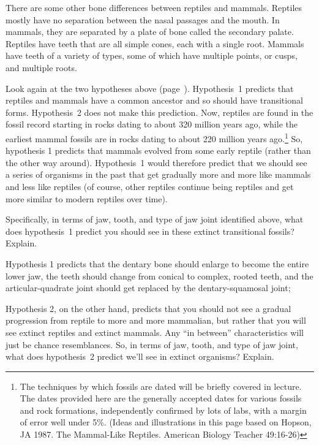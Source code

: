 \documentclass[12pt, hidelinks]{exam}
\newcommand*\AnswerBox[2]{%
    \parbox[t][#1]{0.92\textwidth}{%
    \begin{solution}#2\end{solution}}
    \vspace{\stretch{1}}
}
\begin{document}
\begin{questions}
There are some other bone differences between reptiles and mammals.  Reptiles mostly have no separation between the nasal passages and the mouth.  In mammals, they are separated by a plate of bone called the secondary palate.  Reptiles have teeth that are all simple cones, each with a single root.  Mammals have teeth of a variety of types, some of which have multiple points, or cusps, and multiple roots.  

Look again at the two hypotheses above (page~\pageref{hypothesis1}). Hypothesis~1 predicts that reptiles and mammals have a common ancestor and so should have transitional forms. Hypothesis~2 does not make this prediction. Now, reptiles are found in the fossil record starting in rocks dating to about 320 million years ago, while the earliest mammal fossils are in rocks dating to about 220 million years ago.\footnote{The techniques by which fossils are dated will be briefly covered in lecture. The dates provided here are the generally accepted dates for various fossils and rock formations, independently confirmed by lots of labs, with a margin of error well under 5\%.  (Ideas and illustrations in this page based on Hopson, JA 1987.  The Mammal-Like Reptiles.  American Biology Teacher 49:16-26)}  So, hypothesis 1 predicts that mammals evolved from some early reptile (rather than the other way around). Hypothesis~1 would therefore predict that we should see a series of organisms in the past that get gradually more and more like mammals and less like reptiles (of course, other reptiles continue being reptiles and get more similar to modern reptiles over time).  

\question
Specifically, in terms of jaw, tooth, and type of jaw joint identified above, what does hypothesis~1 predict you should see in these extinct transitional fossils?  Explain.

\AnswerBox{6\baselineskip}{%
Hypothesis 1 predicts that the dentary bone should enlarge to become the entire lower jaw, the teeth should change from conical to complex, rooted teeth, and the articular-quadrate joint should get replaced by the dentary-squamosal joint; 
}


\question
Hypothesis 2, on the other hand, predicts that you should not see a gradual progression from reptile to more and more mammalian, but rather that you will see extinct reptiles and extinct mammals.  Any ``in between'' characteristics will just be chance resemblances.  So, in terms of jaw, tooth,  and type of jaw joint, what does hypothesis~2 predict we'll see in extinct organisms?  Explain.


\end{questions}
\end{document}
